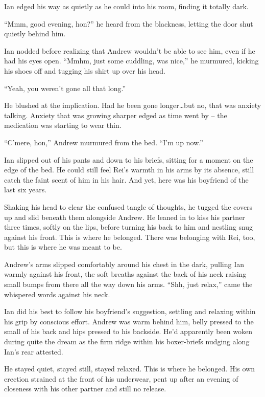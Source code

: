 \secdiv{}

Ian edged his way as quietly as he could into his room, finding it totally dark.

``Mmm, good evening, hon?'' he heard from the blackness, letting the door shut quietly behind him.

Ian nodded before realizing that Andrew wouldn't be able to see him, even if he had his eyes open. ``Mmhm, just some cuddling, was nice,'' he murmured, kicking his shoes off and tugging his shirt up over his head.

``Yeah, you weren't gone all that long.''

He blushed at the implication. Had he been gone longer\ldots{}but no, that was anxiety talking. Anxiety that was growing sharper edged as time went by -- the medication was starting to wear thin.

``C'mere, hon,'' Andrew murmured from the bed. ``I'm up now.''

Ian slipped out of his pants and down to his briefs, sitting for a moment on the edge of the bed. He could still feel Rei's warmth in his arms by its absence, still catch the faint scent of him in his hair. And yet, here was his boyfriend of the last six years.

Shaking his head to clear the confused tangle of thoughts, he tugged the covers up and slid beneath them alongside Andrew. He leaned in to kiss his partner three times, softly on the lips, before turning his back to him and nestling snug against his front. This is where he belonged. There was belonging with Rei, too, but this is where he was meant to be.

Andrew's arms slipped comfortably around his chest in the dark, pulling Ian warmly against his front, the soft breaths against the back of his neck raising small bumps from there all the way down his arms. ``Shh, just relax,'' came the whispered words against his neck.

Ian did his best to follow his boyfriend's suggestion, settling and relaxing within his grip by conscious effort. Andrew was warm behind him, belly pressed to the small of his back and hips pressed to his backside. He'd apparently been woken during quite the dream as the firm ridge within his boxer-briefs nudging along Ian's rear attested.

He stayed quiet, stayed still, stayed relaxed. This is where he belonged. His own erection strained at the front of his underwear, pent up after an evening of closeness with his other partner and still no release.

